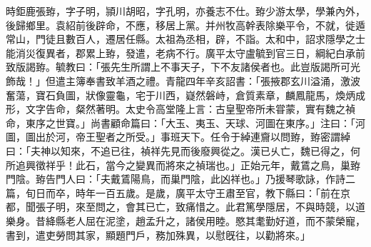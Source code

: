 \begin{pinyinscope}
時鉅鹿張臶，字子明，頴川胡昭，字孔明，亦養志不仕。臶少游太學，學兼內外，後歸鄉里。袁紹前後辟命，不應，移居上黨。并州牧高幹表除樂平令，不就，徙遁常山，門徒且數百人，遷居任縣。太祖為丞相，辟，不詣。太和中，詔求隱學之士能消災復異者，郡累上臶，發遣，老病不行。廣平太守盧毓到官三日，綱紀白承前致版謁臶。毓教曰：「張先生所謂上不事天子，下不友諸侯者也。此豈版謁所可光飾哉！」但遣主簿奉書致羊酒之禮。青龍四年辛亥詔書：「張掖郡玄川溢涌，激波奮蕩，寶石負圖，狀像靈龜，宅于川西，嶷然磐峙，倉質素章，麟鳳龍馬，煥炳成形，文字告命，粲然著明。太史令高堂隆上言：古皇聖帝所未甞蒙，實有魏之禎命，東序之世寶。」尚書顧命篇曰：「大玉、夷玉、天球、河圖在東序。」注曰：「河圖，圖出於河，帝王聖者之所受。」事班天下。任令于綽連齎以問臶，臶密謂綽曰：「夫神以知來，不追已往，禎祥先見而後廢興從之。漢已乆亡，魏已得之，何所追興徵祥乎！此石，當今之變異而將來之禎瑞也。」正始元年，戴鵀之鳥，巢臶門陰。臶告門人曰：「夫戴鵀陽鳥，而巢門陰，此凶祥也。」乃援琴歌詠，作詩二篇，旬日而卒，時年一百五歲。是歲，廣平太守王肅至官，教下縣曰：「前在京都，聞張子明，來至問之，會其已亡，致痛惜之。此君篤學隱居，不與時競，以道樂身。昔絳縣老人屈在泥塗，趙孟升之，諸侯用睦。愍其耄勤好道，而不蒙榮寵，書到，遣吏勞問其家，顯題門戶，務加殊異，以慰旣往，以勸將來。」


\end{pinyinscope}
